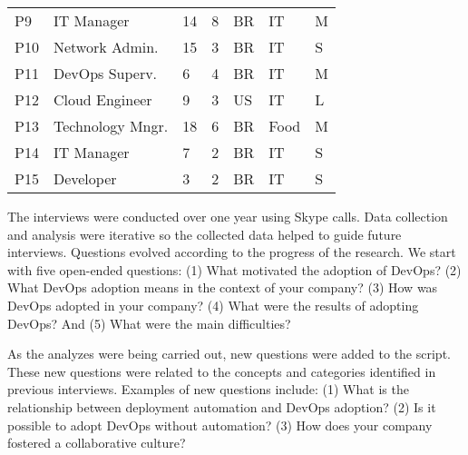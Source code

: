 \begin{table}[t]
\begin{tabular}{p{0.4cm}p{2.6cm}p{0.4cm}p{0.45cm}p{0.5cm}p{1.3cm}p{0.3cm}}
P9                   & IT Manager            & 14           & 8           & BR            & IT                 & M                               \\ \centering

P10                  & Network Admin.        & 15           & 3           & BR            & IT                 & S                               \\ \centering

P11                  & DevOps Superv.                & 6            & 4           & BR            & IT                  & M                               \\ \centering

P12                  & Cloud Engineer              & 9            & 3           & US            & IT                  & L                               \\ \centering

P13                  & Technology Mngr.                 & 18            & 6           & BR            & Food                  & M                               \\ \centering

P14                  & IT Manager            & 7            & 2           & BR            & IT                  & S                               \\ \centering

P15                  & Developer        & 3            & 2           & BR            & IT                  & S \\ \bottomrule
\end{tabular}
\end{table}



The interviews were conducted over one year using Skype calls.
Data collection and analysis were iterative so the collected data helped to guide
future interviews. Questions evolved according to
the progress of the research. We start with five open-ended questions: (1) What
motivated the adoption of DevOps? (2) What DevOps adoption means in the context of
your company? (3) How was DevOps adopted in your company? (4) What were the
results of adopting DevOps? And (5) What were the main difficulties?

As the analyzes were being carried out, new questions were added to the script.
These new questions were related to the concepts and categories identified in
previous interviews. Examples of new questions include: (1) What is the
relationship between deployment automation and DevOps adoption? (2) Is it
possible to adopt DevOps without automation? (3) How does your company fostered a collaborative culture?

